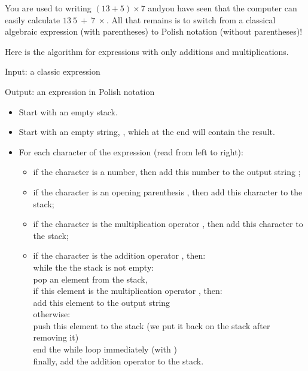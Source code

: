 \documentclass[11pt,class=report,crop=false]{standalone}
\begin{document}
\begin{activite}

 
 
You are used to writing \og{}$(13+5) \times 7$\fg{} andyou have seen that the computer can easily calculate \og{}$13 \  5 \ + \ 7 \ \times$\fg{}. All that remains is to switch from a classical algebraic expression (with parentheses) to Polish notation (without parentheses)!

  Here is the algorithm for expressions with only additions and multiplications. 
 
  \begin{algorithme}
  Input: a classic expression

  Output: an expression in Polish notation

  \begin{itemize}
    \item Start with an empty stack.  
    
    \item Start with an empty string, , which at the end will contain the result.
   
   \item For each character of the expression (read from left to right):
   \begin{itemize} 
     \item if the character is a number, then add this number to the output string ;
     
     \item if the character is an opening parenthesis , then add this character to the stack;
     
     \item if the character is the multiplication operator , then add this character to the stack;  
        
     \item if the character is the addition operator , then: \\
     while the the stack is not empty: \\
     \indentation pop an element from the stack, \\
     \indentation if this element is the multiplication operator , then: \\
     \indentation \indentation add this element   to the output string \\
     \indentation otherwise: \\
     \indentation \indentation push this element   to the stack (we put it back on the stack after removing it)\\
     \indentation \indentation end the \og{}while\fg{} loop immediately  (with )\\              
     finally, add the  addition operator to the stack.


\end{itemize}
\end{itemize}
\end{algorithme}
\end{activite}
\end{document}
